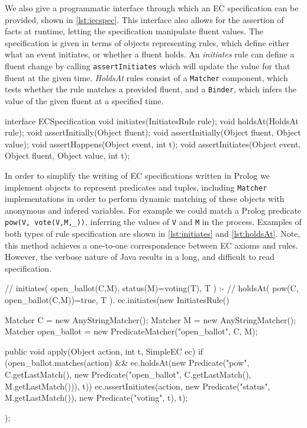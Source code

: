 We also give a programmatic interface through which an \ac{EC} specification
can be provided, shown in \autoref{lst:iecspec}. This interface also allows for
the assertion of facts at runtime, letting the specification manipulate
fluent values. The specification is given in terms of objects representing
rules, which define either what an event initiates, or whether a fluent holds.
An \emph{initiates} rule can define a fluent change by calling
\texttt{assertInitiates} which will update the value for that fluent at the
given time. \emph{HoldsAt} rules consist of a \texttt{Matcher} component, which
tests whether the rule matches a provided fluent, and a \texttt{Binder}, which
infers the value of the given fluent at a specified time.

\begin{java}[label=lst:iecspec,caption=Java interface for declaration of an EC specification]
interface ECSpecification {
	void initiates(InitiatesRule rule);
	void holdsAt(HoldsAt rule);
	void assertInitially(Object fluent);
	void assertInitially(Object fluent, Object value);
	void assertHappens(Object event, int t);
	void assertInitiates(Object event, Object fluent, Object value, int t);
}
\end{java}

In order to simplify the writing of \ac{EC} specifications written in Prolog
we implement objects to represent predicates and tuples, including
\texttt{Matcher} implementations in order to perform dynamic matching of these
objects with anonymous and infered variables. For example we could match a
Prolog predicate \texttt{pow(V, vote(V,M,\_))}, inferring the values of
\texttt{V} and \texttt{M} in the process. Examples of both types of rule
specification are shown in \autoref{lst:initiates} and \autoref{lst:holdsAt}.
Note, this method achieves a one-to-one correspondence between \ac{EC} axioms
and rules. However, the verbose nature of Java results in a long, and
difficult to read specification.

\begin{java}[label=lst:initiates, caption={[Example of initiates rule]Example of initiates rule. Matchers are used to built a description of the event we wish to match. The matched arguments in this event are then used in the \emph{holdsAt} query to check whether the actor is empowered to perform the action. If the event and query are both valid we assert the change to the \emph{status} predicate.}]
// initiates( open_ballot(C,M), status(M)=voting(T), T ) :-
//     holdsAt( pow(C, open_ballot(C,M))=true, T ).
ec.initiates(new InitiatesRule() {
	Matcher C = new AnyStringMatcher();
	Matcher M = new AnyStringMatcher();
	Matcher open_ballot = new PredicateMatcher("open_ballot", C, M);

	public void apply(Object action, int t, SimpleEC ec) {
		if (open_ballot.matches(action)
				&& ec.holdsAt(new Predicate("pow", C.getLastMatch(),
						new Predicate("open_ballot", C.getLastMatch(),
								M.getLastMatch())), t)) {
			ec.assertInitiates(action,
					new Predicate("status", M.getLastMatch()),
					new Predicate("voting", t), t);
		}
	}
});
\end{java}

